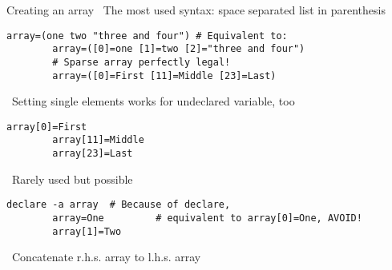 \begin{frame}[fragile]{Creating an array}
    \vspace{-1mm}\centering
    \, The most used syntax: space separated list in parenthesis
    \smallskip
    \begin{lstlisting}[style=MyBash, numbers=none]
        array=(one two "three and four") # Equivalent to:
        array=([0]=one [1]=two [2]="three and four")
        # Sparse array perfectly legal!
        array=([0]=First [11]=Middle [23]=Last)
    \end{lstlisting}
    \medskip
    \, Setting single elements works for undeclared variable, too
    \smallskip
    \begin{lstlisting}[style=MyBash, numbers=none]
        array[0]=First
        array[11]=Middle
        array[23]=Last
    \end{lstlisting}
    \medskip
    \, Rarely used but possible
    \smallskip
    \begin{lstlisting}[style=MyBash, numbers=none]
        declare -a array  # Because of declare,
        array=One         # equivalent to array[0]=One, AVOID!
        array[1]=Two 
    \end{lstlisting}
    \bigskip
    \, Concatenate r.h.s. array to l.h.s. array\par
\end{frame}

